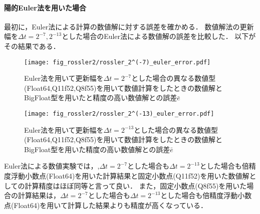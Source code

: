 \paragraph*{陽的Euler法を用いた場合}
最初に，Euler法による計算の数値解に対する誤差を確かめる．
数値解法の更新幅を$\Delta t = 2^{-7},2^{-13}$とした場合のEuler法による数値解の誤差を比較した．
以下がその結果である．
\begin{figure}[H]
    \centering
    \begin{minipage}[b]{0.48\columnwidth}
        \centering
        \texttt{[image: fig\_rossler2/rossler\_2^(-7)\_euler\_error.pdf]}
        \caption{Euler法を用いて更新幅を$\Delta t = 2^{-7}$とした場合の異なる数値型(Float64,Q11f52,Q8f55)を用いて数値計算をしたときの数値解とBigFloat型を用いたと精度の高い数値解との誤差$\bar{e}$}
        \label{fig:rossler_2^(-7)_euler_error}
    \end{minipage}
    \hspace{0.01\columnwidth}
    \begin{minipage}[b]{0.48\columnwidth}
        \centering
        \texttt{[image: fig\_rossler2/rossler\_2^(-13)\_euler\_error.pdf]}
        \caption{Euler法を用いて更新幅を$\Delta t =  2^{-13}$とした場合の異なる数値型(Float64,Q11f52,Q8f55)を用いて数値計算をしたときの数値解とBigFloat型を用いた精度の高い数値解との誤差$\bar{e}$}
        \label{fig:rossler_2^(-13)_euler_error}
    \end{minipage}
\end{figure} 
Euler法による数値実験では，,$\Delta t = 2^{-7}$とした場合も$\Delta t =  2^{-13}$とした場合も倍精度浮動小数点(Float64)を用いた計算結果と固定小数点(Q11f52)を用いた数値解としての計算精度はほぼ同等と言って良い．
また，固定小数点(Q8f55)を用いた場合の計算結果は，$\Delta t = 2^{-7}$とした場合も$\Delta t =  2^{-13}$とした場合も倍精度浮動小数点(Float64)を用いて計算した結果よりも精度が高くなっている．


